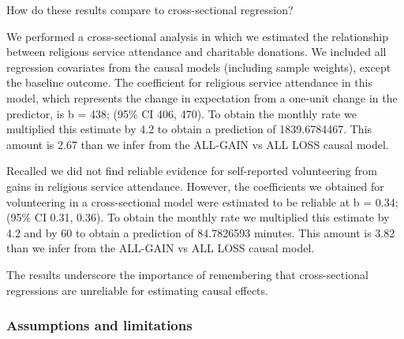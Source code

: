 \documentclass[
  single column]{article}
\begin{document}
How do these results compare to cross-sectional regression?

We performed a cross-sectional analysis in which we estimated the
relationship between religious service attendance and charitable
donations. We included all regression covariates from the causal models
(including sample weights), except the baseline outcome. The coefficient
for religious service attendance in this model, which represents the
change in expectation from a one-unit change in the predictor, is b =
438; (95\% CI 406, 470). To obtain the monthly rate we multiplied this
estimate by 4.2 to obtain a prediction of 1839.6784467. This amount is
2.67 than we infer from the ALL-GAIN vs ALL LOSS causal model.

Recalled we did not find reliable evidence for self-reported
volunteering from gains in religious service attendance. However, the
coefficients we obtained for volunteering in a cross-sectional model
were estimated to be reliable at b = 0.34; (95\% CI 0.31, 0.36). To
obtain the monthly rate we multiplied this estimate by 4.2 and by 60 to
obtain a prediction of 84.7826593 minutes. This amount is 3.82 than we
infer from the ALL-GAIN vs ALL LOSS causal model.

The results underscore the importance of remembering that
cross-sectional regressions are unreliable for estimating causal
effects.

\subsubsection{Assumptions and
limitations}\label{assumptions-and-limitations}
\end{document}
